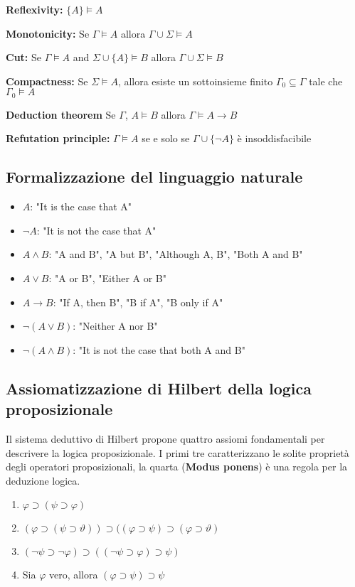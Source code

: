 \textbf{Reflexivity:} $\lbrace A \rbrace \models A$

\textbf{Monotonicity:} Se $\Gamma \models A$ allora $\Gamma \cup \Sigma \models A$

\textbf{Cut:} Se $\Gamma \models A$ and $\Sigma \cup \lbrace A \rbrace \models B$ allora $\Gamma \cup \Sigma \models B$

\textbf{Compactness:} Se $\Sigma \models A$, allora esiste un sottoinsieme finito $\Gamma_0 \subseteq \Gamma$ tale che $\Gamma_0 \models A$

\textbf{Deduction theorem} Se $\Gamma$, $A \models B$ allora $\Gamma \models A \to B$

\textbf{Refutation principle:} $\Gamma \models A$ se e solo se $\Gamma \cup \lbrace \lnot A \rbrace$ è insoddisfacibile

\subsection{Formalizzazione del linguaggio naturale}

\begin{itemize}
\item $A$: "It is the case that A"
\item $\lnot A$: "It is not the case that A"
\item $A \land B$: "A and B", "A but B", "Although A, B", "Both A and B"
\item $A \lor B$: "A or B", "Either A or B"
\item $A \to B$: "If A, then B", "B if A", "B only if A"
\item $\lnot (A \lor B)$: "Neither A nor B"
\item $\lnot (A \land B)$: "It is not the case that both A and B"
\end{itemize}

\subsection{Assiomatizzazione di Hilbert della logica proposizionale}
Il sistema deduttivo di Hilbert propone quattro assiomi fondamentali per descrivere la logica proposizionale. I primi tre caratterizzano le solite proprietà degli operatori proposizionali, la quarta (\textbf{Modus ponens}) è una regola per la deduzione logica.
\begin{enumerate}
\item $\varphi \supset (\psi \supset \varphi)$
\item $(\varphi \supset (\psi \supset \vartheta) ) \supset ((\varphi \supset \psi) \supset (\varphi \supset \vartheta) $
\item $(\lnot \psi \supset \lnot \varphi) \supset ((\lnot \psi \supset \varphi ) \supset \psi )$
\item Sia $\varphi$ vero, allora $(\varphi \supset \psi) \supset \psi$
\end{enumerate}

